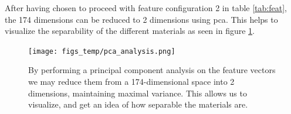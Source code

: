 After having chosen to proceed with feature configuration 2 in table \ref{tab:feat}, the 174 dimensions can be reduced to 2 dimensions using \gls{pca}. This helps to visualize the separability of the different materials as seen in figure \ref{fig:pca}.

\begin{figure}[h]
	\centering
	\texttt{[image: figs\_temp/pca\_analysis.png]}
	\caption{By performing a principal component analysis on the feature vectors we may reduce them from a 174-dimensional space into 2 dimensions, maintaining maximal variance. This allows us to visualize, and get an idea of how separable the materials are.}
	\label{fig:pca}
\end{figure}

